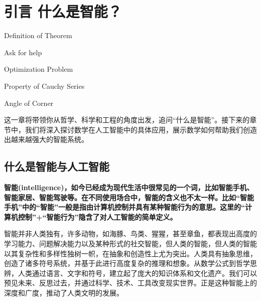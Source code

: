 \chapter{ 引言 什么是智能？}
 \begin{introduction}
  \item Definition of Theorem
  \item Ask for help
  \item Optimization Problem
  \item Property of Cauchy Series
  \item Angle of Corner
\end{introduction}


这一章将带领你从哲学、科学和工程的角度出发，追问“什么是智能”。接下来的章节中，我们将深入探讨数学在人工智能中的具体应用，展示数学如何帮助我们创造出越来越强大的智能系统。

\section{什么是智能与人工智能}

{\textbf{智能(intelligence)，如今已经成为现代生活中很常见的一个词，比如智能手机、智能家居、智能驾驶等。在不同使用场合中，智能的含义也不太一样。比如“智能手机”中的“智能”一般是指由计算机控制并具有某种智能行为的意思。这里的“计算机控制”+“智能行为”隐含了对人工智能的简单定义。}}


智能并非人类独有，许多动物，如海豚、鸟类、猩猩，甚至章鱼，都表现出高度的学习能力、问题解决能力以及某种形式的社交智能，但人类的智能，但人类的智能以其复杂性和多样性独树一帜，在抽象和创造性上尤为突出。人类具有抽象思维，创造了诸多符号系统，并基于此进行高度复杂的推理和想象。从数学公式到哲学思辨，人类通过语言、文字和符号，建立起了庞大的知识体系和文化遗产。我们可以预见未来、反思过去，并通过科学、技术、工具改变现实世界。正是这种智能上的深度和广度，推动了人类文明的发展。

